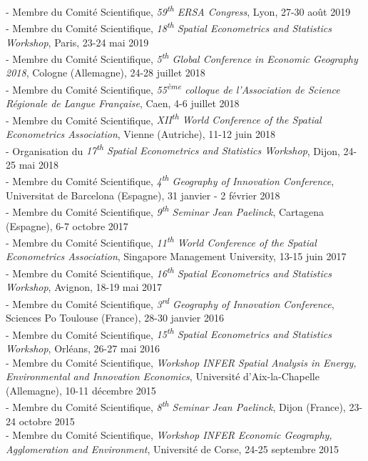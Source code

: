 \documentclass[a4paper,12pt]{article}
\begin{document}
- Membre du Comité Scientifique, \textit{59\textsuperscript{th} ERSA Congress}, Lyon, 27-30 août 2019\\
- Membre du Comité Scientifique, \textit{18\textsuperscript{th} Spatial Econometrics and Statistics Workshop}, Paris, 23-24 mai 2019\\
- Membre du Comité Scientifique, \textit{5\textsuperscript{th} Global Conference in Economic Geography 2018}, Cologne (Allemagne), 24-28 juillet 2018\\
- Membre du Comité Scientifique, \textit{55\textsuperscript{ème} colloque de l'Association de Science Régionale de Langue Française}, Caen, 4-6 juillet 2018\\
- Membre du Comité Scientifique, \textit{XII\textsuperscript{th} World Conference of the Spatial Econometrics Association}, Vienne (Autriche), 11-12 juin 2018\\
- Organisation du \textit{17\textsuperscript{th} Spatial Econometrics and Statistics Workshop}, Dijon, 24-25 mai 2018\\
- Membre du Comité Scientifique, \textit{4\textsuperscript{th} Geography of Innovation Conference}, Universitat de Barcelona (Espagne), 31 janvier - 2 février 2018\\
- Membre du Comité Scientifique, \textit{9\textsuperscript{th} Seminar Jean Paelinck}, Cartagena (Espagne), 6-7 octobre 2017\\
- Membre du Comité Scientifique, \textit{11\textsuperscript{th} World Conference of the Spatial Econometrics Association}, Singapore Management University, 13-15 juin 2017\\
- Membre du Comité Scientifique, \textit{16\textsuperscript{th} Spatial Econometrics and Statistics Workshop}, Avignon, 18-19 mai 2017\\
- Membre du Comité Scientifique, \textit{3\textsuperscript{rd} Geography of Innovation Conference}, Sciences Po Toulouse (France), 28-30 janvier 2016\\
- Membre du Comité Scientifique, \textit{15\textsuperscript{th} Spatial Econometrics and Statistics Workshop}, Orléans, 26-27 mai 2016\\
- Membre du Comité Scientifique, \textit{Workshop INFER Spatial Analysis in Energy, Environmental and Innovation Economics}, Université d'Aix-la-Chapelle (Allemagne), 10-11 décembre 2015\\
- Membre du Comité Scientifique, \textit{8\textsuperscript{th} Seminar Jean Paelinck}, Dijon (France), 23-24 octobre 2015\\
- Membre du Comité Scientifique, \textit{Workshop INFER Economic Geography, Agglomeration and Environment}, Université de Corse, 24-25 septembre 2015\\
\end{document}
